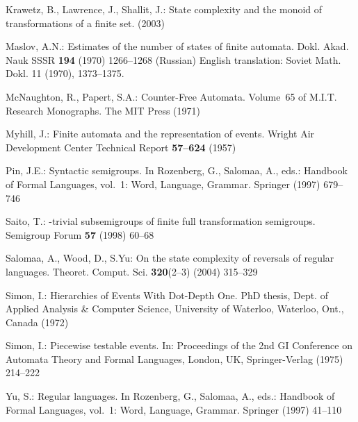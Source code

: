 \documentclass{llncs}
\begin{document}
\begin{thebibliography}{10}
Krawetz, B., Lawrence, J., Shallit, J.:
\newblock State complexity and the monoid of transformations of a finite set.
 (2003)

Maslov, A.N.:
\newblock Estimates of the number of states of finite automata.
\newblock Dokl. Akad. Nauk SSSR \textbf{194} (1970)  1266--1268 (Russian)
  {English} translation: Soviet Math. Dokl. 11 (1970), 1373--1375.

McNaughton, R., Papert, S.A.:
\newblock Counter-Free Automata. Volume~65 of M.I.T. Research Monographs.
\newblock The MIT Press (1971)

Myhill, J.:
\newblock Finite automata and the representation of events.
\newblock Wright Air Development Center Technical Report \textbf{57--624}
  (1957)

Pin, J.E.:
\newblock Syntactic semigroups.
\newblock In Rozenberg, G., Salomaa, A., eds.: Handbook of Formal Languages,
  vol.~1: Word, Language, Grammar.
\newblock Springer (1997)  679--746

Saito, T.:
-trivial subsemigroups of finite full
  transformation semigroups.
\newblock Semigroup Forum \textbf{57} (1998)  60--68

Salomaa, A., Wood, D., S.Yu:
\newblock On the state complexity of reversals of regular languages.
\newblock Theoret. Comput. Sci. \textbf{320}(2–3) (2004)  315--329

Simon, I.:
\newblock Hierarchies of Events With Dot-Depth One.
\newblock PhD thesis, Dept. of Applied Analysis \& Computer Science, University
  of Waterloo, Waterloo, Ont., Canada (1972)

Simon, I.:
\newblock Piecewise testable events.
\newblock In: Proceedings of the 2nd GI Conference on Automata Theory and
  Formal Languages, London, UK, Springer-Verlag (1975)  214--222

Yu, S.:
\newblock Regular languages.
\newblock In Rozenberg, G., Salomaa, A., eds.: Handbook of Formal Languages,
  vol.~1: Word, Language, Grammar.
\newblock Springer (1997)  41--110

\end{thebibliography}
\end{document}
